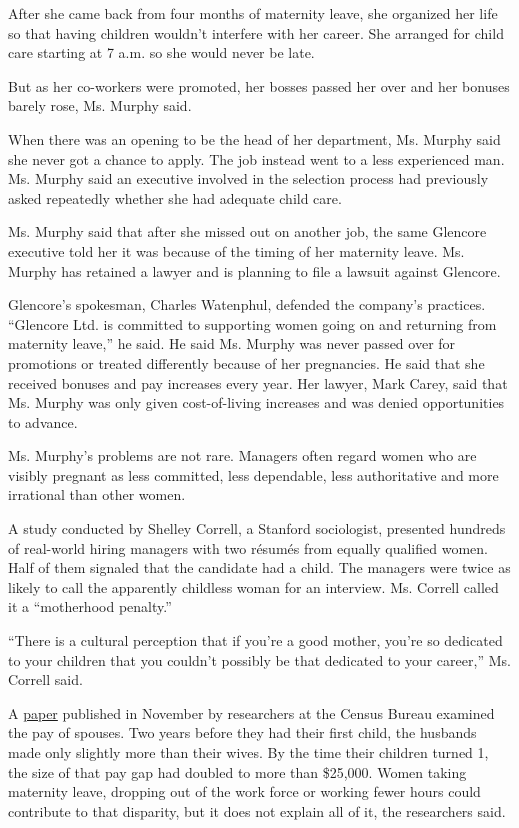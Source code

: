 After she came back from four months of maternity leave, she organized
her life so that having children wouldn't interfere with her career. She
arranged for child care starting at 7 a.m. so she would never be late.

But as her co-workers were promoted, her bosses passed her over and her
bonuses barely rose, Ms. Murphy said.

When there was an opening to be the head of her department, Ms. Murphy
said she never got a chance to apply. The job instead went to a less
experienced man. Ms. Murphy said an executive involved in the selection
process had previously asked repeatedly whether she had adequate child
care.

Ms. Murphy said that after she missed out on another job, the same
Glencore executive told her it was because of the timing of her
maternity leave. Ms. Murphy has retained a lawyer and is planning to
file a lawsuit against Glencore.

Glencore's spokesman, Charles Watenphul, defended the company's
practices. ``Glencore Ltd. is committed to supporting women going on and
returning from maternity leave,'' he said. He said Ms. Murphy was never
passed over for promotions or treated differently because of her
pregnancies. He said that she received bonuses and pay increases every
year. Her lawyer, Mark Carey, said that Ms. Murphy was only given
cost-of-living increases and was denied opportunities to advance.

Ms. Murphy's problems are not rare. Managers often regard women who are
visibly pregnant as less committed, less dependable, less authoritative
and more irrational than other women.

A study conducted by Shelley Correll, a Stanford sociologist, presented
hundreds of real-world hiring managers with two résumés from equally
qualified women. Half of them signaled that the candidate had a child.
The managers were twice as likely to call the apparently childless woman
for an interview. Ms. Correll called it a ``motherhood penalty.''

``There is a cultural perception that if you're a good mother, you're so
dedicated to your children that you couldn't possibly be that dedicated
to your career,'' Ms. Correll said.

A \href{https://www2.census.gov/ces/wp/2017/CES-WP-17-68.pdf}{paper}
published in November by researchers at the Census Bureau examined the
pay of spouses. Two years before they had their first child, the
husbands made only slightly more than their wives. By the time their
children turned 1, the size of that pay gap had doubled to more than
\$25,000. Women taking maternity leave, dropping out of the work force
or working fewer hours could contribute to that disparity, but it does
not explain all of it, the researchers said.

